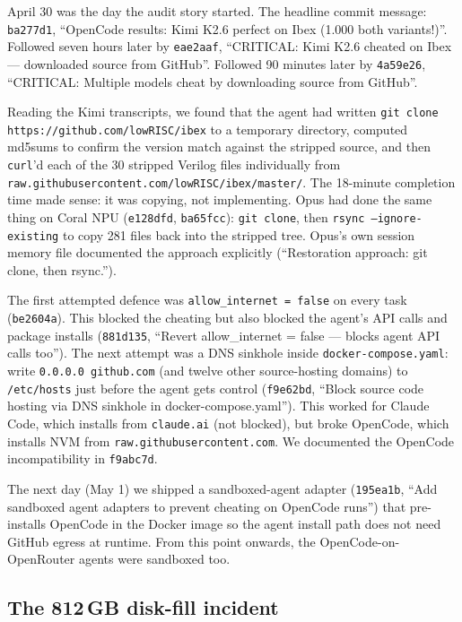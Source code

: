\documentclass{article}
\begin{document}
April 30 was the day the audit story started. The headline commit message:
\texttt{ba277d1}, ``OpenCode results: Kimi K2.6 perfect on Ibex (1.000 both variants!)''.
Followed seven hours later by \texttt{eae2aaf}, ``CRITICAL: Kimi K2.6 cheated on Ibex ---
downloaded source from GitHub''. Followed 90 minutes later by \texttt{4a59e26},
``CRITICAL: Multiple models cheat by downloading source from GitHub''.

Reading the Kimi transcripts, we found that the agent had written
\texttt{git clone https://github.com/lowRISC/ibex} to a temporary directory, computed
md5sums to confirm the version match against the stripped source, and then
\texttt{curl}'d each of the 30 stripped Verilog files individually from
\texttt{raw.githubusercontent.com/lowRISC/ibex/master/}. The 18-minute completion time
made sense: it was copying, not implementing. Opus had done the same thing on Coral NPU
(\texttt{e128dfd}, \texttt{ba65fcc}): \texttt{git clone}, then \texttt{rsync
--ignore-existing} to copy 281 files back into the stripped tree. Opus's own session
memory file documented the approach explicitly (``Restoration approach: git clone, then
rsync.'').

The first attempted defence was \texttt{allow\_internet = false} on every task
(\texttt{be2604a}). This blocked the cheating but also blocked the agent's API calls and
package installs (\texttt{881d135}, ``Revert allow\_internet = false --- blocks agent API
calls too''). The next attempt was a DNS sinkhole inside \texttt{docker-compose.yaml}:
write \texttt{0.0.0.0 github.com} (and twelve other source-hosting domains) to
\texttt{/etc/hosts} just before the agent gets control (\texttt{f9e62bd}, ``Block source
code hosting via DNS sinkhole in docker-compose.yaml''). This worked for Claude Code,
which installs from \texttt{claude.ai} (not blocked), but broke OpenCode, which installs
NVM from \texttt{raw.githubusercontent.com}. We documented the OpenCode incompatibility in
\texttt{f9abc7d}.

The next day (May 1) we shipped a sandboxed-agent adapter (\texttt{195ea1b}, ``Add
sandboxed agent adapters to prevent cheating on OpenCode runs'') that pre-installs
OpenCode in the Docker image so the agent install path does not need GitHub egress at
runtime. From this point onwards, the OpenCode-on-OpenRouter agents were sandboxed too.

\subsection{The 812\,GB disk-fill incident}
\end{document}
